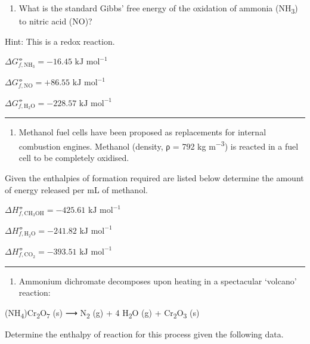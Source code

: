 \documentclass[
]{book}
\providecommand{\tightlist}{%
  \setlength{\itemsep}{0pt}\setlength{\parskip}{0pt}}
\begin{document}
\begin{enumerate}
\def\labelenumi{\arabic{enumi}.}
\tightlist
\item
  What is the standard Gibbs' free energy of the oxidation of ammonia (NH\textsubscript{3}) to nitric acid (NO)?
\end{enumerate}

Hint: This is a redox reaction.

\(ΔG^⦵_{f, \textrm{NH}_3} = −16.45 \textrm{ kJ mol}^{−1}\)

\(ΔG^⦵_{f, \textrm{NO}} = +86.55 \textrm{ kJ mol}^{−1}\)

\(ΔG^⦵_{f, \textrm{H}_2 \textrm{O}} = −228.57 \textrm{ kJ mol}^{−1}\)

\begin{center}\rule{0.5\linewidth}{0.5pt}\end{center}

\begin{enumerate}
\def\labelenumi{\arabic{enumi}.}
\setcounter{enumi}{1}
\tightlist
\item
  Methanol fuel cells have been proposed as replacements for internal combustion engines. Methanol (density, ρ = 792 kg m\textsuperscript{−3}) is reacted in a fuel cell to be completely oxidised.
\end{enumerate}

Given the enthalpies of formation required are listed below determine the amount of energy released per mL of methanol.

\(ΔH^⦵_{f, \textrm{CH}_3\textrm{OH}} = −425.61 \textrm{ kJ mol}^{−1}\)

\(ΔH^⦵_{f, \textrm{H}_2 \textrm{O}} = −241.82 \textrm{ kJ mol}^{−1}\)

\(ΔH^⦵_{f, \textrm{CO}_2} = −393.51 \textrm{ kJ mol}^{−1}\)

\begin{center}\rule{0.5\linewidth}{0.5pt}\end{center}

\begin{enumerate}
\def\labelenumi{\arabic{enumi}.}
\setcounter{enumi}{2}
\tightlist
\item
  Ammonium dichromate decomposes upon heating in a spectacular `volcano' reaction:
\end{enumerate}

(NH\textsubscript{4})Cr\textsubscript{2}O\textsubscript{7} (s) ⟶ N\textsubscript{2} (g) + 4 H\textsubscript{2}O (g) + Cr\textsubscript{2}O\textsubscript{3} (s)

Determine the enthalpy of reaction for this process given the following data.
\end{document}
